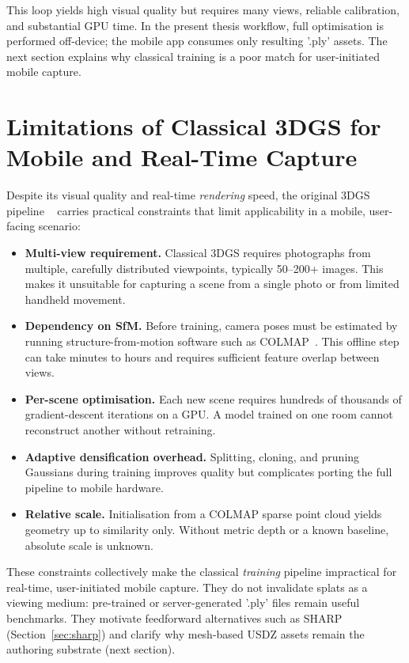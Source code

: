 This loop yields high visual quality but requires many views, reliable calibration, and
substantial GPU time. In the present thesis workflow, full optimisation is performed
off-device; the mobile app consumes only resulting '.ply' assets. The next
section explains why classical training is a poor match for user-initiated mobile
capture.


\section{Limitations of Classical 3DGS for Mobile and Real-Time Capture}
\label{sec:3dgs_limitations}

Despite its visual quality and real-time \emph{rendering} speed, the original 3DGS
pipeline ~\cite{kerbl20233dgs} carries practical constraints that limit applicability in
a mobile, user-facing scenario:

\begin{itemize}
    \item \textbf{Multi-view requirement.} Classical 3DGS requires photographs from
    multiple, carefully distributed viewpoints, typically 50--200+ images. This makes
    it unsuitable for capturing a scene from a single photo or from limited handheld
    movement.

    \item \textbf{Dependency on SfM.} Before training, camera poses must be estimated by
    running structure-from-motion software such as COLMAP~\cite{SSF16}. This offline step
    can take minutes to hours and requires sufficient feature overlap between views.

    \item \textbf{Per-scene optimisation.} Each new scene requires hundreds of thousands
    of gradient-descent iterations on a GPU. A model trained on one room cannot
    reconstruct another without retraining.

    \item \textbf{Adaptive densification overhead.} Splitting, cloning, and pruning
    Gaussians during training improves quality but complicates porting the full pipeline
    to mobile hardware.

    \item \textbf{Relative scale.} Initialisation from a COLMAP sparse point cloud
    yields geometry up to similarity only. Without metric depth or a known baseline,
    absolute scale is unknown.
\end{itemize}

These constraints collectively make the classical \emph{training} pipeline impractical
for real-time, user-initiated mobile capture. They do not invalidate splats as a
viewing medium: pre-trained or server-generated '.ply' files remain
useful benchmarks. They motivate feedforward alternatives such as SHARP (Section~\ref{sec:sharp})
and clarify why mesh-based USDZ assets remain the authoring substrate (next section).


